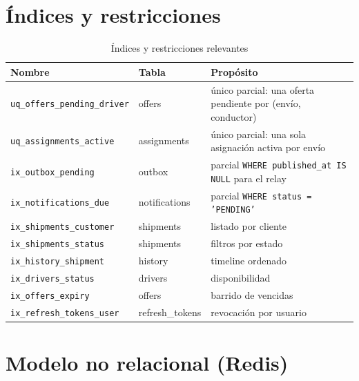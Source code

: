 \documentclass[10pt,letterpaper,twocolumn,oneside]{report}
\newcommand{\pkg}[1]{\texttt{#1}}
\begin{document}
\section{Índices y restricciones}

\begin{table}[t]
\centering
\caption{Índices y restricciones relevantes}
\small
\begin{tabular}{@{}L{4.6cm}L{2.4cm}L{7.4cm}@{}}
\toprule
\textbf{Nombre} & \textbf{Tabla} & \textbf{Propósito}\\
\midrule
\pkg{uq\_offers\_pending\_driver} & offers & único parcial: una oferta pendiente por (envío, conductor)\\
\pkg{uq\_assignments\_active} & assignments & único parcial: una sola asignación activa por envío\\
\pkg{ix\_outbox\_pending} & outbox & parcial \pkg{WHERE published\_at IS NULL} para el relay\\
\pkg{ix\_notifications\_due} & notifications & parcial \pkg{WHERE status = 'PENDING'}\\
\pkg{ix\_shipments\_customer} & shipments & listado por cliente\\
\pkg{ix\_shipments\_status} & shipments & filtros por estado\\
\pkg{ix\_history\_shipment} & history & timeline ordenado\\
\pkg{ix\_drivers\_status} & drivers & disponibilidad\\
\pkg{ix\_offers\_expiry} & offers & barrido de vencidas\\
\pkg{ix\_refresh\_tokens\_user} & refresh\_tokens & revocación por usuario\\
\bottomrule
\end{tabular}
\end{table}

\section{Modelo no relacional (Redis)}
\end{document}
